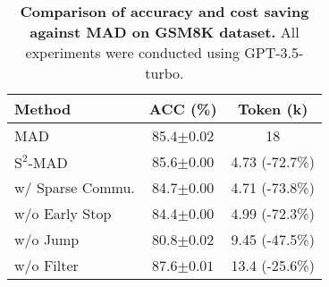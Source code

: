\begin{table}[t]
    \centering
    \setlength\tabcolsep{1.5 pt}
    \begin{tabular}{lcc}
        \toprule
        \textbf{Method} & \textbf{ACC (\%)} & \textbf{Token (k)} \\ 
        \midrule
        MAD & 85.4\scriptsize{$\pm 0.02$} & 18 \\ 
        \midrule
        \({\text{S}^2\text{-MAD}}\) & 85.6\scriptsize{$\pm 0.00$} & 4.73 (-72.7\%) \\ 
        \midrule
        w/ Sparse Commu. & 84.7\scriptsize{$\pm 0.00$} & 4.71 (-73.8\%) \\  
        w/o Early Stop& 84.4\scriptsize{$\pm 0.00$} & 4.99 (-72.3\%) \\ 
        w/o Jump & 80.8\scriptsize{$\pm 0.02$} & 9.45 (-47.5\%) \\ 
        w/o Filter & 87.6\scriptsize{$\pm 0.01$} & 13.4 (-25.6\%) \\ 
        \bottomrule
    \end{tabular}
    \caption{\textbf{Comparison of accuracy and cost saving against MAD on GSM8K dataset.} All experiments were conducted using GPT-3.5-turbo.}
    \label{tab:ablation}
\end{table}
